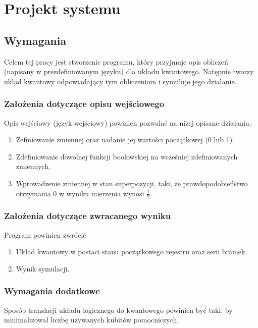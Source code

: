 \chapter{Projekt systemu}
\thispagestyle{chapterBeginStyle}
\label{rozdzial2}

\section{Wymagania}
Celem tej pracy jest stworzenie programu, który przyjmuje opis obliczeń (napisany w prezdefiniowanym języku) dla układu kwantowego. Natępnie tworzy układ kwantowy odpowiadający tym obliczeniom i symuluje jego działanie.
\subsection{Założenia dotyczące opisu wejściowego}
Opis wejściowy (język wejściowy) powinien pozwalać na niżej opisane działania.
\begin{enumerate}
    \item Zefiniowanie zmiennej oraz nadanie jej wartości początkowej (0 lub 1).
    \item Zdefiniowanie dowolnej funkcji boolowskiej na wcześniej zdefiniowanych zmiennych.
    \item Wprowadzenie zmiennej w stan superpozycji, taki, że prawdopodobieństwo otrzymania 0 w wyniku mierzenia wynosi $\frac{1}{2}$.
\end{enumerate}
\subsection{Założenia dotyczące zwracanego wyniku}
Program powinien zwrócić
\begin{enumerate}
    \item Układ kwantowy w postaci stanu początkowego rejestru oraz serii bramek.
    \item Wynik symulacji.
\end{enumerate}
\subsection{Wymagania dodatkowe}
Sposób translacji układu logicznego do kwantowego powinien być taki, by minimalizował liczbę używanych kubitów pomocniczych.

